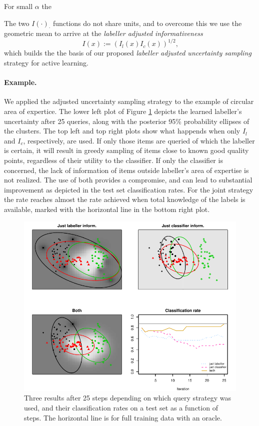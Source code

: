 \documentclass[10pt, onecolumn]{article}
\begin{document}
For small $\alpha$ the 

The two $I(\cdot)_{\cdot}$ functions do not share units, and to overcome
this we use the geometric mean to arrive at the \emph{labeller
  adjusted informativeness}
\[
I(x):=(I_l(x) I_c(x))^{1/2}\mbox{,}
\]
which builds the the basis of our proposed \emph{labeller adjusted
  uncertainty sampling} strategy for active learning.   


\paragraph{Example.} We applied the adjusted uncertainty sampling
strategy to the example of circular area of expertice. The lower left
plot of Figure \ref{fig:four_square} depicts the learned labeller's
uncertainty after 25 queries, along with the posterior 95\%
probability ellipses of the clusters. The top left and top right plots
show what happends when only $I_l$ and $I_c$, respectively, are
used. If only those items are queried of which the labeller is certain, it
will result in greedy sampling of items close to known good quality
points, regardless of their utility to the classifier. If only the
classifier is concerned, the lack of information of items outside
labeller's area of expertise is not realized. The use of both provides
a compromise, and can lead to substantial improvement as depicted in
the test set classification rates. For the joint strategy the rate
reaches almost the rate achieved when total knowledge of the labels is
available, marked with the horizontal line in the bottom right plot.

\begin{figure}[hbtp]
\centering
\includegraphics[width=6in]{figures/3_fields_and_tsplot.pdf}
\caption{Three results after 25 steps depending on which query
  strategy was used, and their classification rates on a test set as a
  function of steps. The horizontal line is for full training data
  with an oracle.}
\label{fig:four_square}
\end{figure}
\end{document}
